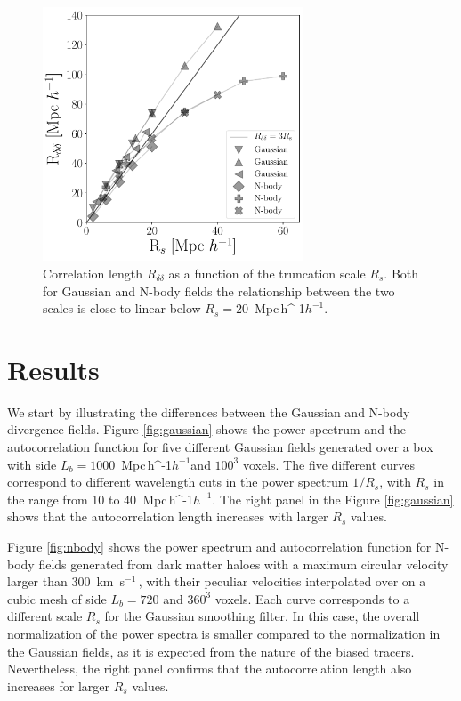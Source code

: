 \documentclass[usenatbib]{mnras}
\newcommand{\Mpch}{\,{\rm Mpc}\,\ifmmode h^{-1}\else $h^{-1}$\fi}
\newcommand{\kms}{\,{\rm km}\ s$^{-1}$\,}
\begin{document}
\begin{figure}
    \centering
    \includegraphics[width=220pt]{correlation_length.pdf}
    \caption{Correlation length $R_{\delta\delta}$ as a function of the truncation scale $R_s$.
    Both for Gaussian and N-body fields the relationship between the two scales is close to linear below $R_{s}=20$ \Mpch.}
    \label{fig:correlation length}
\end{figure}

\section{Results}
\label{sec:results}

We start by illustrating the differences between the Gaussian and N-body divergence fields.
Figure \ref{fig:gaussian} shows the power spectrum and the autocorrelation function for five different Gaussian fields generated over a box with side $L_b=1000$ \Mpch and $100^3$ voxels.
The five different curves correspond to different wavelength cuts in the power spectrum  $1/R_s$, with $R_s$ in the range from 10 to 40 \Mpch.
The right panel in the Figure \ref{fig:gaussian} shows that the autocorrelation length increases with larger $R_{s}$ values.

Figure \ref{fig:nbody} shows the power spectrum and autocorrelation function for N-body fields generated 
from dark matter haloes with a maximum circular velocity larger than $300$ \kms, with their peculiar velocities interpolated over on a cubic mesh of side $L_b=720$ \hMpc and  $360^3$ voxels.
Each curve corresponds to a different scale $R_s$ for the Gaussian smoothing filter.
In this case, the overall normalization of the power spectra is smaller compared to the normalization in the Gaussian fields, as it is expected from the nature of the biased tracers.
Nevertheless, the right panel confirms that the autocorrelation length also increases for larger $R_{s}$ values.
\end{document}
